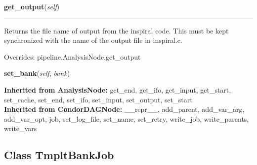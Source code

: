     \label{inspiral:InspiralNode:get_output}
    \vspace{0.5ex}

    \noindent\begin{boxedminipage}{\textwidth}

    \raggedright \textbf{get\_output}(\textit{self})

    \vspace{-1.5ex}

    \rule{\textwidth}{0.5\fboxrule}
    Returns the file name of output from the inspiral code. This must be 
    kept synchronized with the name of the output file in inspiral.c.

    \vspace{1ex}

      Overrides: pipeline.AnalysisNode.get\_output

    \end{boxedminipage}

    \label{inspiral:InspiralNode:set_bank}
    \vspace{0.5ex}

    \noindent\begin{boxedminipage}{\textwidth}

    \raggedright \textbf{set\_bank}(\textit{self}, \textit{bank})

    \end{boxedminipage}

  \noindent\textbf{Inherited from AnalysisNode:}
    get\_end,
    get\_ifo,
    get\_input,
    get\_start,
    set\_cache,
    set\_end,
    set\_ifo,
    set\_input,
    set\_output,
    set\_start
    \\
  \noindent\textbf{Inherited from CondorDAGNode:}
    \_\_repr\_\_,
    add\_parent,
    add\_var\_arg,
    add\_var\_opt,
    job,
    set\_log\_file,
    set\_name,
    set\_retry,
    write\_job,
    write\_parents,
    write\_vars


\subsection{Class TmpltBankJob}

